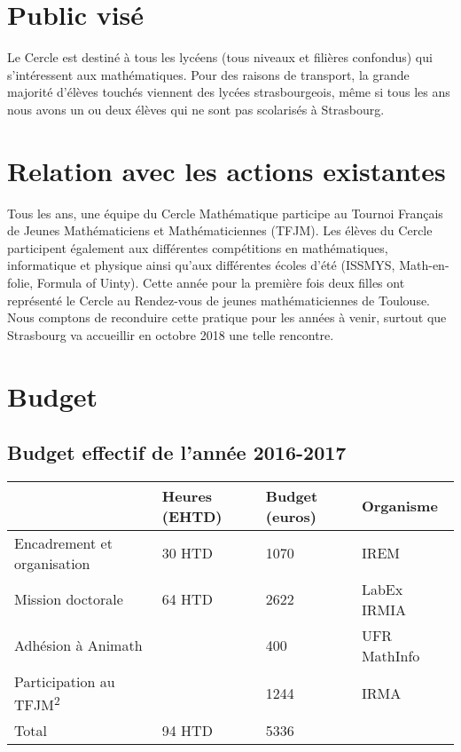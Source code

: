 \documentclass[11pt,notitlepage]{article}
\begin{document}
\section{Public vis\'e}

Le Cercle est destin\'e \`a tous les lyc\'eens (tous niveaux et fili\`eres confondus) qui s'int\'eressent aux math\'ematiques. Pour des raisons de transport, la grande majorit\'e d'\'el\`eves touch\'es viennent des lyc\'ees strasbourgeois, m\^eme si tous les ans nous avons un ou deux \'el\`eves qui ne sont pas scolaris\'es \`a Strasbourg. 

\section{Relation avec les actions existantes}
Tous les ans, une \'equipe du Cercle Math\'ematique participe au Tournoi Fran\c{c}ais de Jeunes Math\'ematiciens et Math\'ematiciennes (TFJM). Les \'el\`eves du Cercle participent \'egalement aux diff\'erentes comp\'etitions en math\'ematiques, informatique et physique ainsi qu'aux diff\'erentes \'ecoles d'\'et\'e (ISSMYS, Math-en-folie, Formula of Uinty). Cette ann\'ee pour la premi\`ere fois deux filles ont repr\'esent\'e le Cercle au Rendez-vous de jeunes math\'ematiciennes de Toulouse. Nous comptons de reconduire cette pratique pour les ann\'ees \`a venir, surtout que Strasbourg va accueillir en octobre 2018 une telle rencontre.


\section{Budget}

\subsection{Budget effectif de l'ann\'ee 2016-2017}

\begin{center}
	\begin{tabular}{|p{4 cm}|p{2cm}|p{2cm}|l|}
	\hline
	& Heures (EHTD) & Budget (euros) & Organisme\\
	\hline
	Encadrement et organisation& 30 HTD& 1070 & IREM\\
	\hline 
	Mission doctorale & 64 HTD &2622 & LabEx IRMIA\\
	\hline 
	Adh\'esion \`a Animath& & 400 & UFR MathInfo\\
	\hline
	Participation au TFJM\textsuperscript{2}& & 1244 & IRMA\\
	\hline
	Total & 94 HTD&  5336& \\
	\hline	
\end{tabular}
\end{center}
\end{document}
